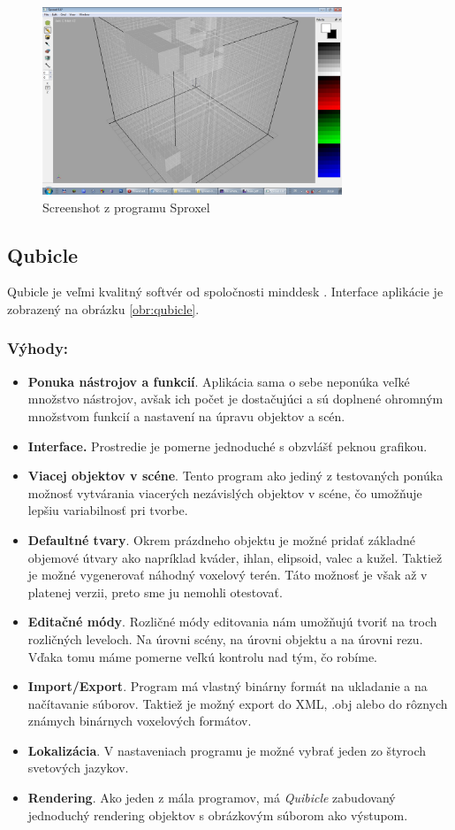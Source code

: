 \begin{figure}[ht!]
	\centering
	\includegraphics[width=0.8\textwidth]{sproxel.jpg}
	\caption[Sproxel]{Screenshot z programu Sproxel}
	\label{obr:sproxel}
\end{figure}

\eject

\subsection{Qubicle}
Qubicle je veľmi kvalitný softvér od spoločnosti minddesk \cite{qubicle}. Interface aplikácie je zobrazený na obrázku \ref{obr:qubicle}.
\subsubsection{Výhody:}
\begin{itemize}
	\item \textbf{Ponuka nástrojov a funkcií}. Aplikácia sama o sebe neponúka veľké množstvo nástrojov, avšak ich počet je dostačujúci a sú doplnené ohromným množstvom funkcií a nastavení na úpravu objektov a scén.
	\item \textbf{Interface.} Prostredie je pomerne jednoduché s obzvlášť peknou grafikou.
	\item \textbf{Viacej objektov v scéne}. Tento program ako jediný z testovaných ponúka možnosť vytvárania viacerých nezávislých objektov v scéne, čo umožňuje lepšiu variabilnosť pri tvorbe.
	\item \textbf{Defaultné tvary}. Okrem prázdneho objektu je možné pridať základné objemové útvary ako napríklad kváder, ihlan, elipsoid, valec a kužel. Taktiež je možné vygenerovať náhodný voxelový terén. Táto možnosť je však až v platenej verzii, preto sme ju nemohli otestovať.
	\item \textbf{Editačné módy}. Rozličné módy editovania nám umožňujú tvoriť na troch rozličných leveloch. Na úrovni scény, na úrovni objektu a na úrovni rezu. Vďaka tomu máme pomerne veľkú kontrolu nad tým, čo robíme. 
	\item \textbf{Import/Export}. Program má vlastný binárny formát na ukladanie a na načítavanie súborov. Taktiež je možný export do XML, .obj alebo do rôznych známych binárnych voxelových formátov.
	\item \textbf{Lokalizácia}. V nastaveniach programu je možné vybrať jeden zo štyroch svetových jazykov.
	\item \textbf{Rendering}. Ako jeden z mála programov, má \textit{Quibicle} zabudovaný jednoduchý rendering objektov s obrázkovým súborom ako výstupom.
\end{itemize}
